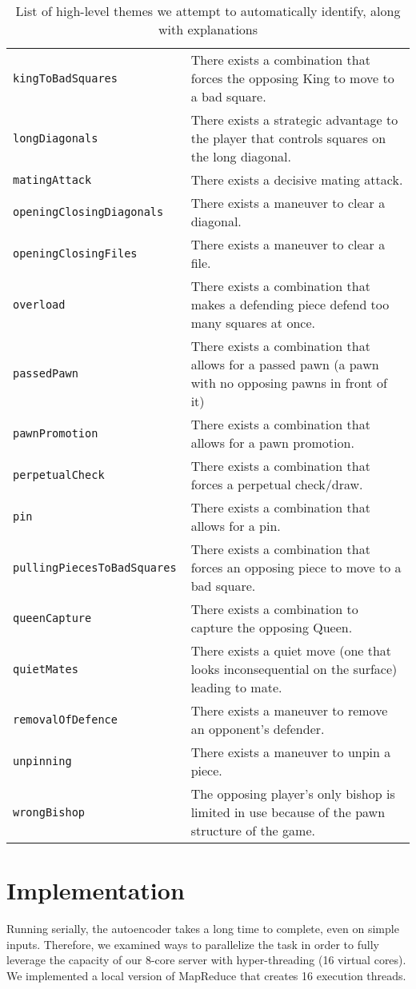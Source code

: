 \documentclass[11pt]{article}
\begin{document}
\begin{table*}
\begin{tabular}{lp{}}
\tt{kingToBadSquares} & There exists a combination that forces the opposing King to move to a bad square. \\
\tt{longDiagonals} & There exists a strategic advantage to the player that controls squares on the long diagonal. \\
\tt{matingAttack} & There exists a decisive mating attack. \\
\tt{openingClosingDiagonals} & There exists a maneuver to clear a diagonal. \\
\tt{openingClosingFiles} & There exists a maneuver to clear a file. \\
\tt{overload} & There exists a combination that makes a defending piece defend too many squares at once. \\
\tt{passedPawn} & There exists a combination that allows for a passed pawn (a pawn with no opposing pawns in front of it) \\
\tt{pawnPromotion} & There exists a combination that allows for a pawn promotion. \\
\tt{perpetualCheck} & There exists a combination that forces a perpetual check/draw. \\
\tt{pin} & There exists a combination that allows for a pin. \\
\tt{pullingPiecesToBadSquares} & There exists a combination that forces an opposing piece to move to a bad square. \\
\tt{queenCapture} & There exists a combination to capture the opposing Queen. \\
\tt{quietMates} & There exists a quiet move (one that looks inconsequential on the surface) leading to mate. \\
\tt{removalOfDefence} & There exists a maneuver to remove an opponent’s defender. \\
\tt{unpinning} & There exists a maneuver to unpin a piece. \\
\tt{wrongBishop} & The opposing player’s only bishop is limited in use because of the pawn structure of the game. \\ \hline
\end{tabular}
\caption{List of high-level themes we attempt to automatically identify, along with explanations}
\label{table:themes}
\end{table*}



\section{Implementation} %
Running serially, the autoencoder takes a long time to complete, even on simple inputs. Therefore, we examined ways to parallelize the task in order to fully leverage the capacity of our 8-core server with hyper-threading (16 virtual cores). We implemented a local version of MapReduce that creates 16 execution threads.
\end{document}
